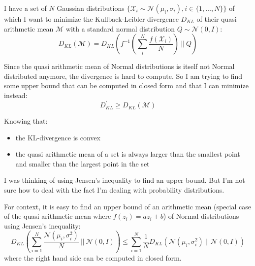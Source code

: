 \documentclass[11pt]{article}
\begin{document}
    I have a set of $N$ Gaussian distributions $\{\mathcal{X}_i \sim \mathcal{N}(\mu _i, \sigma _i), i \in \{1, \dots, N\}\}$ of which I want to minimize the Kullback-Leibler divergence $D_{KL}$ of their quasi arithmetic mean $\mathcal{M}$ with a standard normal distribution $Q \sim \mathcal{N}(0,I)$:
    $$D_{KL}(\mathcal{M}) = D_{KL}\left(f^{-1}\left(\sum ^{N} _i \frac{f(\mathcal{X}_i)}{N}\right)\ ||\ Q\right)$$

    Since the quasi arithmetic mean of Normal distributions is itself not Normal distributed anymore, the divergence is hard to compute.
    So I am trying to find some upper bound that can be computed in closed form and that I can minimize instead:
    $$D_{KL}^{\prime} \geq D_{KL}(\mathcal{M})$$

    Knowing that:
    \begin{itemize}
        \item the KL-divergence is convex
        \item the quasi arithmetic mean of a set is always larger than the smallest point and smaller than the largest point in the set
    \end{itemize}

    I was thinking of using Jensen's inequality to find an upper bound.
    But I'm not sure how to deal with the fact I'm dealing with probability distributions.
    \newline

    For context, it is easy to find an upper bound of an arithmetic mean (special case of the quasi arithmetic mean where $f(z_i) = az_i +b$) of Normal distributions using Jensen's inequality:
    $$D_{KL} \left( \sum _{i=1} ^N \frac{\mathcal{N}(\mu _i, \sigma_i^2)}{N}\ ||\ \mathcal{N}(0, I) \right) \leq \sum _{i=1} ^N \frac{1}{N} D_{KL} \left( \mathcal{N}(\mu _i, \sigma_i^2)\ ||\ \mathcal{N}(0, I) \right)$$
    where the right hand side can be computed in closed form.
\end{document}
